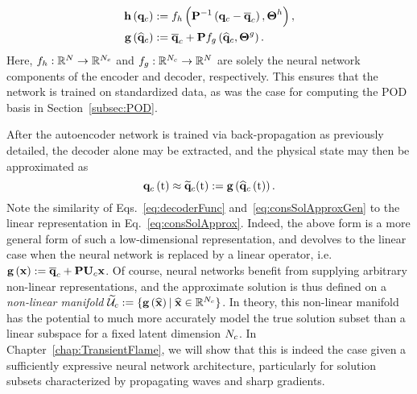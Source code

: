 %
\begin{align}
    \encoderFunc{\consVec} &\defEq \nnLayer_{\encoderVar} \left(\consScaleInv\left(\consVec - \consVecCent\right), \nnParams^{\encoderVar}\right), \\
    \decoderFunc{\consVecCoef} &\defEq \consVecCent + \consScale \nnLayer_{\decoderVar} \left(\consVecCoef, \nnParams^{\decoderVar}\right). \label{eq:decoderFunc}
\end{align}
%
Here, $f_{h}: \mathbb{R}^{N} \rightarrow \mathbb{R}^{N_c}$ and $f_{g}: \mathbb{R}^{N_c} \rightarrow \mathbb{R}^{N}$ are solely the neural network components of the encoder and decoder, respectively. This ensures that the network is trained on standardized data, as was the case for computing the POD basis in Section~\ref{subsec:POD}.

After the autoencoder network is trained via back-propagation as previously detailed, the decoder alone may be extracted, and the physical state may then be approximated as
%
\begin{equation}\label{eq:consSolApproxGen}
    \mathbf{q}_{c}\left(\text{t}\right) \approx \mathbf{\widetilde{q}}_{c}(\text{t}) := \mathbf{g} \left(\mathbf{\widehat{q}}_{c}\left(\text{t}\right)\right).
\end{equation}
%
Note the similarity of Eqs.~\ref{eq:decoderFunc} and~\ref{eq:consSolApproxGen} to the linear representation in Eq.~\ref{eq:consSolApprox}. Indeed, the above form is a more general form of such a low-dimensional representation, and devolves to the linear case when the neural network is replaced by a linear operator, i.e. $\decoderFunc{\nnInput} \defEq \consVecCent + \consScale \consTrial \nnInput$. Of course, neural networks benefit from supplying arbitrary non-linear representations, and the approximate solution is thus defined on a \textit{non-linear manifold} $\consTrialSpace \defEq \{\decoderFunc{\nnInputCoef} \vert \; \nnInputCoef \inROne{\numConsModes} \}$. In theory, this non-linear manifold has the potential to much more accurately model the true solution subset than a linear subspace for a fixed latent dimension $N_c$. In Chapter~\ref{chap:TransientFlame}, we will show that this is indeed the case given a sufficiently expressive neural network architecture, particularly for solution subsets characterized by propagating waves and sharp gradients.


